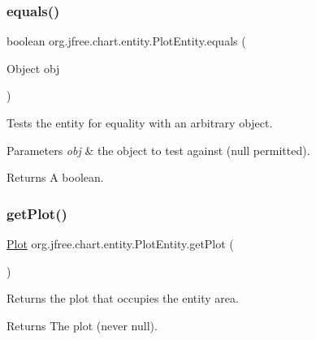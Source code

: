 \subsubsection{\texorpdfstring{equals()}{equals()}}
{\footnotesize\ttfamily boolean org.\+jfree.\+chart.\+entity.\+Plot\+Entity.\+equals (\begin{DoxyParamCaption}\item[{Object}]{obj }\end{DoxyParamCaption})}

Tests the entity for equality with an arbitrary object.


\begin{DoxyParams}{Parameters}
{\em obj} & the object to test against ({\ttfamily null} permitted).\\
\hline
\end{DoxyParams}
\begin{DoxyReturn}{Returns}
A boolean. 
\end{DoxyReturn}
\mbox{\label{classorg_1_1jfree_1_1chart_1_1entity_1_1_plot_entity_a8fc50155cb1968b3a98279b9fd59e410}} 
\subsubsection{\texorpdfstring{get\+Plot()}{getPlot()}}
{\footnotesize\ttfamily \mbox{\hyperlink{classorg_1_1jfree_1_1chart_1_1plot_1_1_plot}{Plot}} org.\+jfree.\+chart.\+entity.\+Plot\+Entity.\+get\+Plot (\begin{DoxyParamCaption}{ }\end{DoxyParamCaption})}

Returns the plot that occupies the entity area.

\begin{DoxyReturn}{Returns}
The plot (never {\ttfamily null}). 
\end{DoxyReturn}
\mbox{\label{classorg_1_1jfree_1_1chart_1_1entity_1_1_plot_entity_aaa0ebd4eea2bd9ab4151fe570e8f7e16}} 
